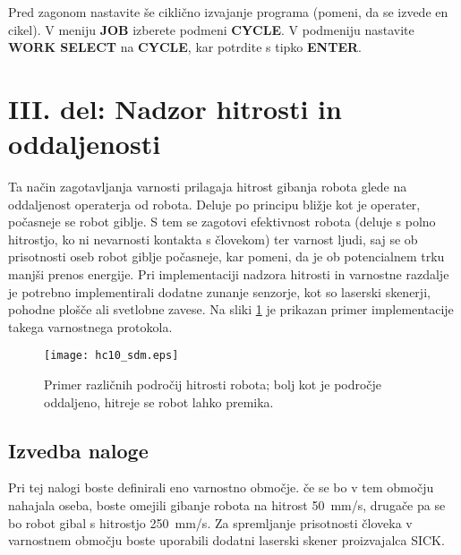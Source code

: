 Pred zagonom nastavite še ciklično izvajanje programa (pomeni, da se izvede en cikel). V meniju \textbf{JOB} izberete podmeni \textbf{CYCLE}. V podmeniju nastavite \textbf{WORK SELECT} na \textbf{CYCLE}, kar potrdite s tipko \textbf{ENTER}.

\vspace{5mm}


\section{III. del: Nadzor hitrosti in oddaljenosti}

Ta način zagotavljanja varnosti prilagaja hitrost gibanja robota glede na oddaljenost operaterja od robota. Deluje po principu bližje kot je operater, počasneje se robot giblje. S tem se zagotovi efektivnost robota (deluje s polno hitrostjo, ko ni nevarnosti kontakta s človekom) ter varnost ljudi, saj se ob prisotnosti oseb robot giblje počasneje, kar pomeni, da je ob potencialnem trku manjši prenos energije. Pri implementaciji nadzora hitrosti in varnostne razdalje je potrebno implementirali dodatne zunanje senzorje, kot so laserski skenerji, pohodne plošče ali svetlobne zavese. Na sliki \ref{fig:hc10_sdm} je prikazan primer implementacije takega varnostnega protokola.

\begin{figure}[!hbt]
	\centering
	\texttt{[image: hc10\_sdm.eps]}
	\caption{Primer različnih področij hitrosti robota; bolj kot je področje oddaljeno, hitreje se robot lahko premika.}
	\label{fig:hc10_sdm}
\end{figure}

\subsection*{Izvedba naloge}

Pri tej nalogi boste definirali eno varnostno območje. če se bo v tem območju nahajala oseba, boste omejili gibanje robota na hitrost 50~mm/s, drugače pa se bo robot gibal s hitrostjo 250~mm/s. Za spremljanje prisotnosti človeka v varnostnem območju boste uporabili dodatni laserski skener proizvajalca SICK.

